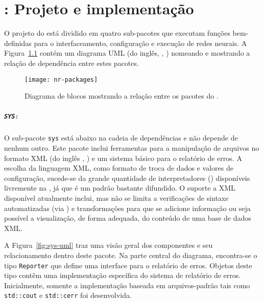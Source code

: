 \typeout{ ====================================================================}
\typeout{ ====================================================================}

\chapter{: Projeto e implementação}
\label{ap:framework}

O projeto do  está dividido em quatro sub-pacotes que
executam funções bem-definidas para o interfaceamento, configuração e execução
de redes neurais. A Figura~\ref{fig:nr-packages} contém um diagrama UML (do
inglês, , \cite{booch}) nomeando e
mostrando a relação de dependência entre estes pacotes.

\begin{figure}
\begin{center}
\texttt{[image: nr-packages]}
\end{center}
\caption{Diagrama de blocos mostrando a relação entre os pacotes do
.}
\label{fig:nr-packages}
\end{figure}

\paragraph{\texttt{SYS}:} O sub-pacote \texttt{sys} está abaixo na cadeia de
dependências e não depende de nenhum outro. Este pacote inclui ferramentas
para a manipulação de arquivos no formato XML (do inglês
, \cite{xml}) e um sistema básico para
o relatório de erros. A escolha da linguagem XML, como formato de troca de
dados e valores de configuração, sucede-se da grande quantidade de
interpretadores () disponíveis livremente na , já
que é um padrão bastante difundido. O suporte a XML disponível atualmente
inclui, mas não se limita a verificações de sintaxe automatizadas (via
) e transformações para que se adicione informação ou seja
possível a visualização, de forma adequada, do conteúdo de uma base de dados
XML.

A Figura~\ref{fig:sys-uml} traz uma visão geral dos componentes e seu
relacionamento dentro deste pacote. Na parte central do diagrama, encontra-se o
tipo \texttt{Reporter} que define uma interface para o relatório de
erros. Objetos deste tipo contêm uma implementação específica do sistema de
relatório de erros. Inicialmente, somente a implementação baseada em
arquivos-padrão tais como \texttt{std::cout} e \texttt{std::cerr}
\cite{web:gcc-stl} foi desenvolvida. 

